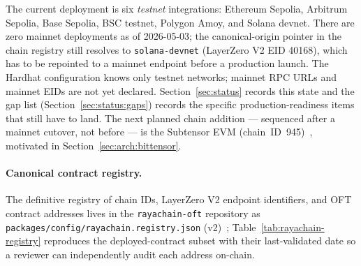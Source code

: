\documentclass[11pt,a4paper]{article}
\begin{document}
The current deployment is six \emph{testnet} integrations: Ethereum Sepolia,
Arbitrum Sepolia, Base Sepolia, BSC testnet, Polygon Amoy, and Solana devnet.
There are zero mainnet deployments as of 2026-05-03; the canonical-origin pointer
in the chain registry still resolves to \texttt{solana-devnet} (LayerZero V2 EID
40168), which has to be repointed to a mainnet endpoint before a production
launch. The Hardhat configuration knows only testnet networks; mainnet RPC URLs
and mainnet EIDs are not yet declared. Section~\ref{sec:status} records this
state and the gap list (Section~\ref{sec:status:gaps}) records the specific
production-readiness items that still have to land. The next planned chain
addition --- sequenced after a mainnet cutover, not before --- is the Subtensor
EVM (chain~ID~945)~\cite{opentensor2024evm}, motivated in
Section~\ref{sec:arch:bittensor}.

\paragraph{Canonical contract registry.} The definitive registry of chain IDs,
LayerZero V2 endpoint identifiers, and OFT contract addresses lives in the
\texttt{rayachain-oft} repository as \texttt{packages/config/rayachain.registry.json}
(v2)~\cite{rayachain2026registry}; Table~\ref{tab:rayachain-registry} reproduces the
deployed-contract subset with their last-validated date so a reviewer can
independently audit each address on-chain.
\end{document}
